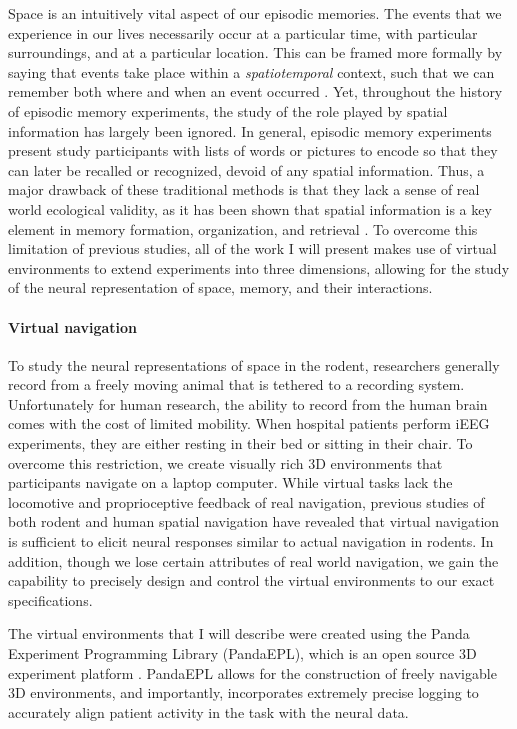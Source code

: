 Space is an intuitively vital aspect of our episodic memories. The events that we experience in our lives necessarily occur at a particular time, with particular surroundings, and at a particular location. This can be framed more formally by saying that events take place within a \textit{spatiotemporal} context, such that we can remember both where and when an event occurred \citep{Tulv83,Eich04}. Yet, throughout the history of episodic memory experiments, the study of the role played by spatial information has largely been ignored. In general, episodic memory experiments present study participants with lists of words or pictures to encode so that they can later be recalled or recognized, devoid of any spatial information. Thus, a major drawback of these traditional methods is that they lack a sense of real world ecological validity, as it has been shown that spatial information is a key element in memory formation, organization, and retrieval \citep{MillEtal12a}. To overcome this limitation of previous studies, all of the work I will present makes use of virtual environments to extend experiments into three dimensions, allowing for the study of the neural representation of space, memory, and their interactions.

\paragraph{Virtual navigation} 

To study the neural representations of space in the rodent, researchers generally record from a freely moving animal that is tethered to a recording system. Unfortunately for human research, the ability to record from the human brain comes with the cost of limited mobility. When hospital patients perform iEEG experiments, they are either resting in their bed or sitting in their chair. To overcome this restriction, we create visually rich 3D environments that participants navigate on a laptop computer. While virtual tasks lack the locomotive and proprioceptive feedback of real navigation, previous studies of both rodent \citep{HarvEtal09,ChenEtal13} and human \citep{EkstEtal03,JacoEtal10,JacoEtal13} spatial navigation have revealed that virtual navigation is sufficient to elicit neural responses similar to actual navigation in rodents. In addition, though we lose certain attributes of real world navigation, we gain the capability to precisely design and control the virtual environments to our exact specifications.

The virtual environments that I will describe were created using the Panda Experiment Programming Library (PandaEPL), which is an open source 3D experiment platform \citep{SolwEtal13}. PandaEPL allows for the construction of freely navigable 3D environments, and importantly, incorporates extremely precise logging to accurately align patient activity in the task with the neural data.

